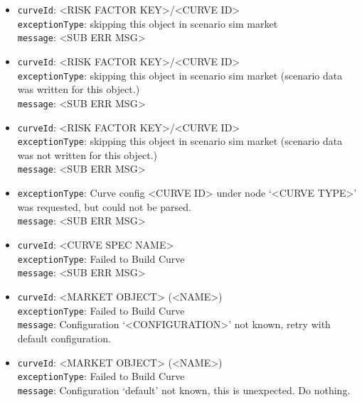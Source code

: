 \begin{itemize}

  \item \lstinline!curveId!: <RISK FACTOR KEY>/<CURVE ID> \\
        \lstinline!exceptionType!: skipping this object in scenario sim market \\
        \lstinline!message!: <SUB ERR MSG>

  \item \lstinline!curveId!: <RISK FACTOR KEY>/<CURVE ID> \\
        \lstinline!exceptionType!: skipping this object in scenario sim market (scenario data was written for this object.) \\
        \lstinline!message!: <SUB ERR MSG>

  \item \lstinline!curveId!: <RISK FACTOR KEY>/<CURVE ID> \\
        \lstinline!exceptionType!: skipping this object in scenario sim market (scenario data was not written for this object.) \\
        \lstinline!message!: <SUB ERR MSG>


  \item \lstinline!exceptionType!: Curve config <CURVE ID> under node `<CURVE TYPE>' was requested, but could not be parsed. \\
        \lstinline!message!: <SUB ERR MSG>

  \item \lstinline!curveId!: <CURVE SPEC NAME> \\
        \lstinline!exceptionType!: Failed to Build Curve \\
        \lstinline!message!: <SUB ERR MSG>

  \item \lstinline!curveId!: <MARKET OBJECT> (<NAME>) \\
        \lstinline!exceptionType!: Failed to Build Curve \\
        \lstinline!message!: Configuration `<CONFIGURATION>' not known, retry with default configuration.

  \item \lstinline!curveId!: <MARKET OBJECT> (<NAME>) \\
        \lstinline!exceptionType!: Failed to Build Curve \\
        \lstinline!message!: Configuration `default' not known, this is unexpected. Do nothing.

  \ifdefined\UserGuide
  \else
    
  \fi

\end{itemize}

